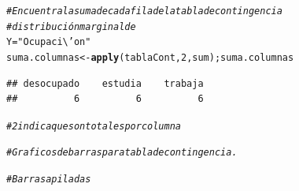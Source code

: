 \documentclass[12pt,letterpaper]{article}\usepackage[]{graphicx}\usepackage[]{color}
\makeatletter
\newcommand{\hlnum}[1]{\textcolor[rgb]{0.686,0.059,0.569}{#1}}%
\newcommand{\hlstr}[1]{\textcolor[rgb]{0.192,0.494,0.8}{#1}}%
\newcommand{\hlcom}[1]{\textcolor[rgb]{0.678,0.584,0.686}{\textit{#1}}}%
\newcommand{\hlstd}[1]{\textcolor[rgb]{0.345,0.345,0.345}{#1}}%
\newcommand{\hlkwb}[1]{\textcolor[rgb]{0.69,0.353,0.396}{#1}}%
\newcommand{\hlkwd}[1]{\textcolor[rgb]{0.737,0.353,0.396}{\textbf{#1}}}%
\newenvironment{kframe}{%
 \def\at@end@of@kframe{}%
 \ifinner\ifhmode%
  \def\at@end@of@kframe{\end{minipage}}%
  \begin{minipage}{\columnwidth}%
 \fi\fi%
 \def\FrameCommand##1{\hskip\@totalleftmargin \hskip-\fboxsep
 \colorbox{shadecolor}{##1}\hskip-\fboxsep
     \hskip-\linewidth \hskip-\@totalleftmargin \hskip\columnwidth}%
 \MakeFramed {\advance\hsize-\width
   \@totalleftmargin\z@ \linewidth\hsize
   \@setminipage}}%
 {\par\unskip\endMakeFramed%
 \at@end@of@kframe}
\newenvironment{knitrout}{}{} %
\makeatother
\begin{document}
\begin{enumerate}
\begin{knitrout}
\color{fgcolor}\begin{kframe}
\begin{alltt}
\hlcom{# Encuentra la suma de cada filade la tabla de contingencia }
\hlcom{# distribución marginal de }
\hlstd{Y}\hlkwb{=}\hlstr{"Ocupaci\textbackslash{}'on"}
\hlstd{suma.columnas} \hlkwb{<-} \hlkwd{apply}\hlstd{(tablaCont,}\hlnum{2}\hlstd{,sum); suma.columnas}
\end{alltt}
\begin{verbatim}
## desocupado    estudia    trabaja 
##          6          6          6
\end{verbatim}
\begin{alltt}
\hlcom{# 2 indica que son totales por columna }
\end{alltt}
\end{kframe}
\end{knitrout}

 
\begin{knitrout}
\color{fgcolor}\begin{kframe}
\begin{alltt}
\hlcom{# Graficos de barras para tabla de contingencia.}

\hlcom{# Barras apiladas }


\end{alltt}
\end{kframe}
\end{knitrout}
\end{enumerate}
\end{document}
